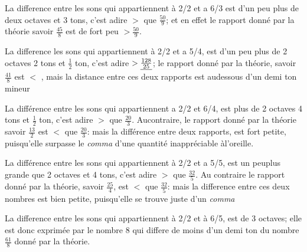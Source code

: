 \documentclass[11pt,a4paper]{article}
\begin{document}

La difference entre les sons qui appartiennent à 2/2 et a 6/3
est d'un peu plus de deux octaves et 3 tons, c'est adire $>$ que
$\frac{50}{9}$; et en effet le rapport donné par la théorie savoir
$\frac{45}{8}$ est de fort peu $> \frac{50}{9}$.

La difference  les sons qui appartiennent à 2/2 et a 5/4, est
d'un peu plus de 2 octaves 2 tons et $\frac{1}{2}$  ton, c'est adire
$> \uncertain{\frac{128}{25}}$;  le rapport donné par la théorie, savoir
$\frac{41}{8}$ est $<$  , mais   la distance entre ces deux rapports est audessous
d'un demi ton mineur

La différence entre les sons qui appartiennent a 2/2 et 6/4,
est plus de 2 octaves 4 tons et $\frac{1}{2}$ ton, c'est adire $>$ que
$\frac{20}{3}$. Aucontraire, le rapport donné par la théorie
savoir $\frac{13}{2}$ est $<$ que $\frac{20}{3}$: mais la différence entre  deux rapports,
est fort petite, puisqu'elle surpasse le \emph{comma} d'une quantité
inappréciable àl'oreille.

La différence entre les sons qui appartiennent à 2/2 et a
5/5, est un peuplus grande que 2 octaves et 4 tons, c'est adire
$>$ que $\frac{32}{5}$. Au contraire le rapport donné par la théorie,
savoir $\frac{25}{4}$, est $<$ que $\frac{32}{5}$: mais la difference entre ces deux
nombres est bien petite, puisqu'elle se trouve juste d'un \emph{comma}

La difference entre les sons qui appartiennent à 2/2 et à
6/5, est de 3 octaves; elle est donc exprimée par le nombre 8
qui differe de moins d'un demi ton  du nombre $\frac{61}{8}$ donné par la théorie.
\end{document}
